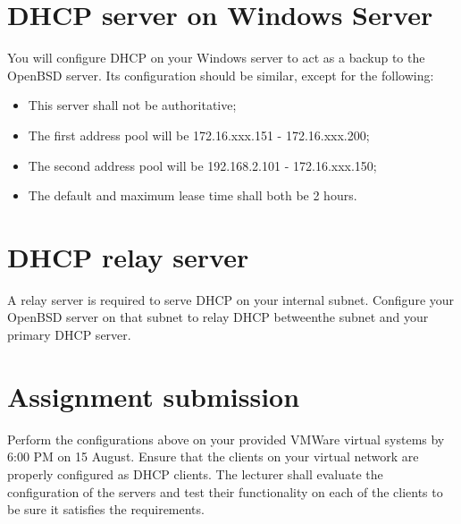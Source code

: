 \documentclass{article}
\begin{document}
\section{DHCP server on Windows Server}
You will configure DHCP on your Windows server to act as a backup to the OpenBSD server.  Its configuration should be similar, except for the following:

\begin{itemize}
  \item This server shall not be authoritative;
  \item The first address pool will be 172.16.xxx.151 - 172.16.xxx.200;  
  \item The second address pool will be 192.168.2.101 - 172.16.xxx.150;
  \item The default and maximum lease time shall both be 2 hours.  
\end{itemize}

\section{DHCP relay server}
A relay server is required to serve DHCP on your internal subnet.  Configure your OpenBSD server on that subnet to relay DHCP betweenthe subnet and your primary DHCP server.

\section{Assignment submission}
Perform the configurations above on your provided VMWare virtual systems by 6:00 PM on 15 August. Ensure that the clients on your virtual network are properly configured as DHCP clients.  The lecturer shall evaluate the configuration of the servers and test their functionality on each of the clients to be sure it satisfies the requirements. 
\end{document}
